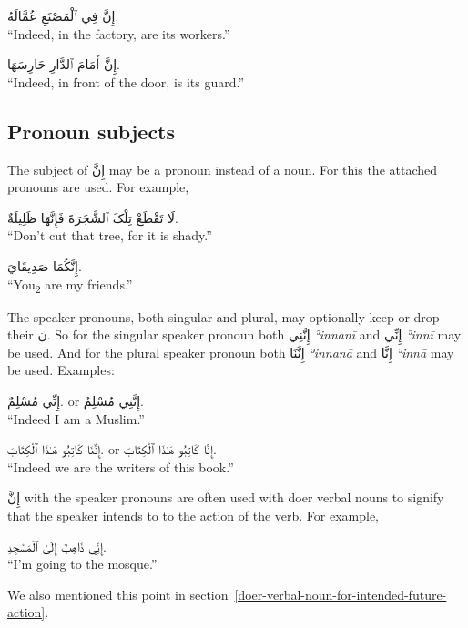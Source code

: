 \documentclass[
  10pt,
]{book}
\begin{document}
\foreignlanguage{arabic}{إِنَّ فِي ٱلْمَصْنَعِ عُمَّالَهُ.}\\
\enquote{Indeed, in the factory, are its workers.}

\foreignlanguage{arabic}{إِنَّ أَمَامَ ٱلدَّارِ حَارِسَهَا.}\\
\enquote{Indeed, in front of the door, is its guard.}

\subsection{Pronoun subjects}\label{pronoun-subjects}

The subject of \foreignlanguage{arabic}{إِنَّ} may be a pronoun instead of a noun. For this the attached pronouns are used. For example,

\foreignlanguage{arabic}{لَا تَقْطَعْ تِلْکَ ٱلشَّجَرَةَ فَإِنَّهَا ظَلِيلَةٌ.}\\
\enquote{Don't cut that tree, for it is shady.}

\foreignlanguage{arabic}{إِنَّکُمَا صَدِيقَايَ.}\\
\enquote{You\textsubscript{2} are my friends.}

The speaker pronouns, both singular and plural, may optionally keep or drop their \foreignlanguage{arabic}{ن}.
So for the singular speaker pronoun both \foreignlanguage{arabic}{إِنَّنِي} \emph{ʾinnanī} and \foreignlanguage{arabic}{إِنِّي} \emph{ʾinnī} may be used.
And for the plural speaker pronoun both \foreignlanguage{arabic}{إِنَّنَا} \emph{ʾinnanā} and \foreignlanguage{arabic}{إِنَّا} \emph{ʾinnā} may be used.
Examples:

\foreignlanguage{arabic}{إِنِّي مُسْلِمٌ.} or \foreignlanguage{arabic}{إِنَّنِي مُسْلِمٌ.}\\
\enquote{Indeed I am a Muslim.}

\foreignlanguage{arabic}{إِنَّنَا کَاتِبُو هَـٰذَا ٱلْکِتَابَ.} or \foreignlanguage{arabic}{إِنَّا کَاتِبُو هَـٰذَا ٱلْکِتَابَ.}\\
\enquote{Indeed we are the writers of this book.}

\foreignlanguage{arabic}{إِنَّ} with the speaker pronouns are often used with doer verbal nouns to signify that the speaker intends to to the action of the verb. For example,

\foreignlanguage{arabic}{إِنِّي ذَاهِبٌ إِلَىٰ ٱلْمَسْجِدِ.}\\
\enquote{I'm going to the mosque.}

We also mentioned this point in section~\ref{doer-verbal-noun-for-intended-future-action}.
\end{document}
